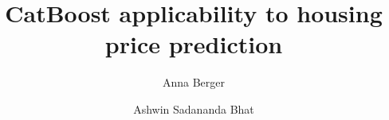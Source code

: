\documentclass[format=acmsmall, review=false, screen=true]{acmart}
\begin{document}
\title{CatBoost applicability to housing price prediction}

\author{Anna Berger}

\author{Ashwin Sadananda Bhat}





\maketitle
\thispagestyle{plain}











 


\end{document}
